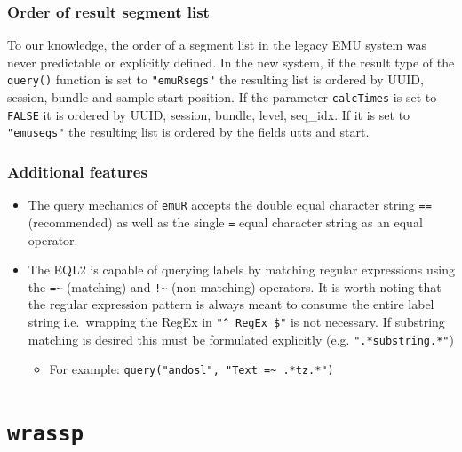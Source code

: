 \documentclass[]{book}
\providecommand{\tightlist}{%
  \setlength{\itemsep}{0pt}\setlength{\parskip}{0pt}}
\theoremstyle{definition}
\theoremstyle{definition}
\theoremstyle{definition}
\theoremstyle{remark}
\begin{document}
\hypertarget{order-of-result-segment-list}{%
\subsection{Order of result segment
list}\label{order-of-result-segment-list}}

To our knowledge, the order of a segment list in the legacy EMU system
was never predictable or explicitly defined. In the new system, if the
result type of the \texttt{query()} function is set to
\texttt{"emuRsegs"} the resulting list is ordered by UUID, session,
bundle and sample start position. If the parameter \texttt{calcTimes} is
set to \texttt{FALSE} it is ordered by UUID, session, bundle, level,
seq\_idx. If it is set to \texttt{"emusegs"} the resulting list is
ordered by the fields utts and start.

\hypertarget{additional-features}{%
\subsection{Additional features}\label{additional-features}}

\begin{itemize}
\tightlist
\item
  The query mechanics of \texttt{emuR} accepts the double equal
  character string \texttt{==} (recommended) as well as the single
  \texttt{=} equal character string as an equal operator.
\item
  The EQL2 is capable of querying labels by matching regular expressions
  using the \texttt{=\textasciitilde{}} (matching) and
  \texttt{!\textasciitilde{}} (non-matching) operators. It is worth
  noting that the regular expression pattern is always meant to consume
  the entire label string i.e.~wrapping the RegEx in
  \texttt{"\^{}\ RegEx\ \$"} is not necessary. If substring matching is
  desired this must be formulated explicitly (e.g.
  \texttt{".*substring.*"})

  \begin{itemize}
  \tightlist
  \item
    For example:
    \texttt{query("andosl",\ "Text\ =\textasciitilde{}\ .*tz.*")}
  \end{itemize}
\end{itemize}

\hypertarget{app-chap:wrassp}{%
\chapter{\texorpdfstring{\texttt{wrassp}}{wrassp}}\label{app-chap:wrassp}}
\end{document}

